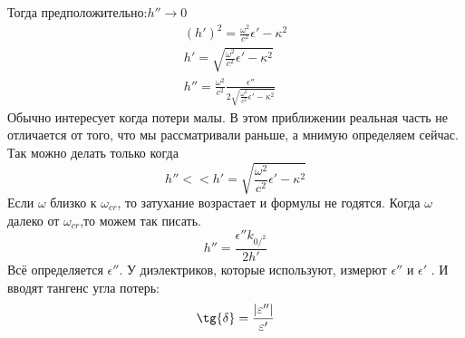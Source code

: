 \begin{enumerate}
	Тогда предположительно:$h''  \rightarrow 0 $
	\begin{gather}
		(h')^2 = \frac{\omega^2}{c^2} \epsilon' - \kappa^2\\
		h' = \sqrt{\frac{\omega^2}{c^2} \epsilon' - \kappa^2}\\
		h'' = \frac{\omega^2}{c^2} \frac{\epsilon''}{2 \sqrt{\frac{\omega^2}{c^2} \epsilon' - \kappa^2}}
	\end{gather}
	Обычно интересует когда потери малы.
	В этом приближении реальная часть не отличается от того, что мы рассматривали раньше, а мнимую определяем сейчас.
	Так можно делать только когда
	\begin{equation}
		h'' << h' = \sqrt{\frac{\omega^2}{c^2} \epsilon' - \kappa^2}
	\end{equation}
	Если $\omega$ близко к $\omega_{cr}$, то затухание возрастает и формулы не годятся.
	Когда $\omega$ далеко от $\omega_{cr}$,то можем так писать.
	\begin{equation}
		h'' = \frac{\epsilon'' k_{0/^2}}{2 h'}
	\end{equation}
	Всё определяется $\epsilon''$. У диэлектриков, которые используют, измерют $\epsilon''$ и $\epsilon'$ .
	И вводят тангенс угла потерь:
	\begin{equation}
		\tg{\delta} = \frac{|\varepsilon''|}{\epsilon'}
	\end{equation}


\end{enumerate}
